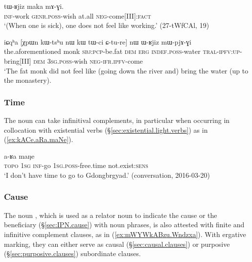 \begin{exe}
\ex  \label{ex:kAnAma.tWRjiz}
\gll [kɤ-nɤma] tɯ-ʁjiz maka mɤ-ɣi. \\
\textsc{inf}-work \textsc{genr}.\textsc{poss}-wish at.all \textsc{neg}-come[III]:\textsc{fact} \\
\glt `(When one is sick), one does not feel like working.' (27-tWfCAl, 19)
\end{exe}

\begin{exe}
\ex  \label{ex:Cture.WRjiz}
\gll  iɕqʰa [χpɯn kɯ-tsʰu nɯ kɯ tɯ-ci ɕ-tu-re] nɯ ɯ-ʁjiz mɯ-pjɤ-ɣi  \\
the.aforementioned monk \textsc{sbj}:\textsc{pcp}-be.fat \textsc{dem} \textsc{erg} \textsc{indef}.\textsc{poss}-water \textsc{tral}-\textsc{ipfv}:\textsc{up}-bring[III] \textsc{dem} \textsc{3sg}.\textsc{poss}-wish \textsc{neg}-\textsc{ifr}.\textsc{ipfv}-come  \\
\glt `The fat monk did not feel like (going down the river and) bring the water (up to the monastery).
\end{exe} 
 
 
\subsubsection{Time} \label{sec:free.time.complement}
The noun  can take infinitival complements, in particular when occurring in collocation with existential verbs (§\ref{sec:existential.light.verbs}) as in (\ref{ex:kACe.aRa.maNe}). 
 
\begin{exe}
\ex  \label{ex:kACe.aRa.maNe}
 a-ʁa maŋe \\
\textsc{topo} \textsc{1sg} \textsc{inf}-go \textsc{1sg}.\textsc{poss}-free.time not.exist:\textsc{sens} \\
\glt `I don't have time to go to Gdongbrgyad.' (conversation, 2016-03-20)
\end{exe} 

 
\subsubsection{Cause} \label{sec:nouns.cause.complement}
The noun , which is used as a relator noun to indicate the cause or the beneficiary (§\ref{sec:IPN.cause}) with noun phrases, is also attested with finite and infinitive complement clauses, as in (\ref{ex:mWYWkABzu.Wndzxa}). With ergative marking, they can either serve as causal (§\ref{sec:causal.clauses}) or purposive (§\ref{sec:purposive.clauses}) subordinate clauses.


